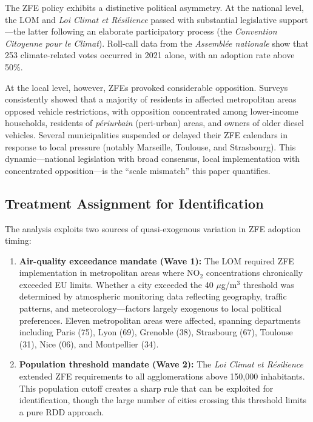 \documentclass[12pt]{article}
\begin{document}
The ZFE policy exhibits a distinctive political asymmetry. At the national level, the LOM and \textit{Loi Climat et R\'esilience} passed with substantial legislative support---the latter following an elaborate participatory process (the \textit{Convention Citoyenne pour le Climat}). Roll-call data from the \textit{Assembl\'ee nationale} show that 253 climate-related votes occurred in 2021 alone, with an adoption rate above 50\%.

At the local level, however, ZFEs provoked considerable opposition. Surveys consistently showed that a majority of residents in affected metropolitan areas opposed vehicle restrictions, with opposition concentrated among lower-income households, residents of \textit{p\'eriurbain} (peri-urban) areas, and owners of older diesel vehicles. Several municipalities suspended or delayed their ZFE calendars in response to local pressure (notably Marseille, Toulouse, and Strasbourg). This dynamic---national legislation with broad consensus, local implementation with concentrated opposition---is the ``scale mismatch'' this paper quantifies.

\subsection{Treatment Assignment for Identification}

The analysis exploits two sources of quasi-exogenous variation in ZFE adoption timing:

\begin{enumerate}
\item \textbf{Air-quality exceedance mandate (Wave 1):} The LOM required ZFE implementation in metropolitan areas where NO$_2$ concentrations chronically exceeded EU limits. Whether a city exceeded the 40 $\mu$g/m$^3$ threshold was determined by atmospheric monitoring data reflecting geography, traffic patterns, and meteorology---factors largely exogenous to local political preferences. Eleven metropolitan areas were affected, spanning departments including Paris (75), Lyon (69), Grenoble (38), Strasbourg (67), Toulouse (31), Nice (06), and Montpellier (34).

\item \textbf{Population threshold mandate (Wave 2):} The \textit{Loi Climat et R\'esilience} extended ZFE requirements to all agglomerations above 150,000 inhabitants. This population cutoff creates a sharp rule that can be exploited for identification, though the large number of cities crossing this threshold limits a pure RDD approach.
\end{enumerate}
\end{document}
